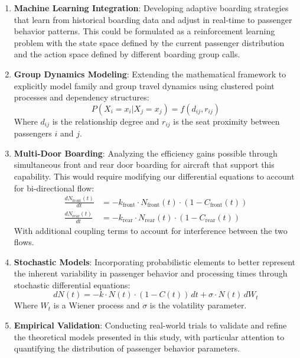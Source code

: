 \documentclass[12pt]{article}
\begin{document}
\begin{enumerate}
    \item \textbf{Machine Learning Integration}: Developing adaptive boarding strategies that learn from historical boarding data and adjust in real-time to passenger behavior patterns. This could be formulated as a reinforcement learning problem with the state space defined by the current passenger distribution and the action space defined by different boarding group calls.
    
    \item \textbf{Group Dynamics Modeling}: Extending the mathematical framework to explicitly model family and group travel dynamics using clustered point processes and dependency structures:
    \begin{equation}
        P(X_i = x_i | X_j = x_j) = f(d_{ij}, r_{ij})
    \end{equation}
    Where $d_{ij}$ is the relationship degree and $r_{ij}$ is the seat proximity between passengers $i$ and $j$.
    
    \item \textbf{Multi-Door Boarding}: Analyzing the efficiency gains possible through simultaneous front and rear door boarding for aircraft that support this capability. This would require modifying our differential equations to account for bi-directional flow:
    \begin{align}
        \frac{dN_{\text{front}}(t)}{dt} &= -k_{\text{front}} \cdot N_{\text{front}}(t) \cdot (1 - C_{\text{front}}(t)) \\
        \frac{dN_{\text{rear}}(t)}{dt} &= -k_{\text{rear}} \cdot N_{\text{rear}}(t) \cdot (1 - C_{\text{rear}}(t))
    \end{align}
    With additional coupling terms to account for interference between the two flows.
    
    \item \textbf{Stochastic Models}: Incorporating probabilistic elements to better represent the inherent variability in passenger behavior and processing times through stochastic differential equations:
    \begin{equation}
        dN(t) = -k \cdot N(t) \cdot (1 - C(t)) \, dt + \sigma \cdot N(t) \, dW_t
    \end{equation}
    Where $W_t$ is a Wiener process and $\sigma$ is the volatility parameter.
    
    \item \textbf{Empirical Validation}: Conducting real-world trials to validate and refine the theoretical models presented in this study, with particular attention to quantifying the distribution of passenger behavior parameters.
\end{enumerate}
\end{document}
